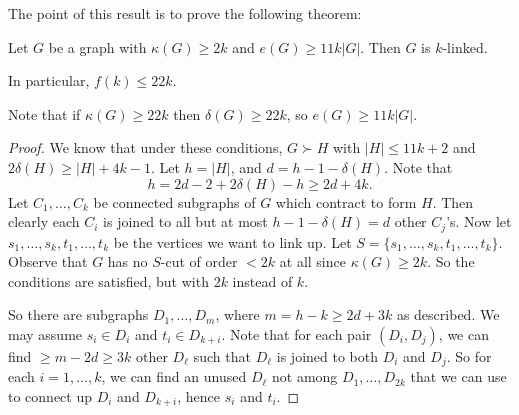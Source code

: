 \documentclass[a4paper]{article}
\begin{document}
The point of this result is to prove the following theorem:
\begin{thm}
  Let $G$ be a graph with $\kappa(G) \geq 2k$ and $e(G) \geq 11k |G|$. Then $G$ is $k$-linked.

  In particular, $f(k) \leq 22k$.
\end{thm}
Note that if $\kappa(G) \geq 22k$ then $\delta(G) \geq 22k$, so $e(G) \geq 11k |G|$.

\begin{proof}
  We know that under these conditions, $G \succ H$ with $|H| \leq 11k + 2$ and $2\delta(H) \geq |H| + 4k - 1$. Let $h = |H|$, and $d = h - 1 - \delta (H)$. Note that
  \[
    h = 2d - 2 + 2 \delta(H) - h \geq 2d + 4k.
  \]
  Let $C_1, \ldots, C_k$ be connected subgraphs of $G$ which contract to form $H$. Then clearly each $C_i$ is joined to all but at most $h - 1 - \delta(H) = d$ other $C_j$'s. Now let $s_1, \ldots, s_k, t_1, \ldots, t_k$ be the vertices we want to link up. Let $S = \{s_1, \ldots, s_k, t_1, \ldots, t_k\}$. Observe that $G$ has no $S$-cut of order $< 2k$ at all since $\kappa(G) \geq 2k$. So the conditions are satisfied, but with $2k$ instead of $k$.

  So there are subgraphs $D_1, \ldots, D_m$, where $m = h - k \geq 2d + 3k$ as described. We may assume $s_i \in D_i$ and $t_i \in D_{k + i}$. Note that for each pair $(D_i, D_j)$, we can find $\geq m - 2d \geq 3k$ other $D_\ell$ such that $D_\ell$ is joined to both $D_i$ and $D_j$. So for each $i = 1, \ldots, k$, we can find an unused $D_\ell$ not among $D_1, \ldots, D_{2k}$ that we can use to connect up $D_i$ and $D_{k + i}$, hence $s_i$ and $t_i$.
\end{proof}

\printindex
\end{document}
